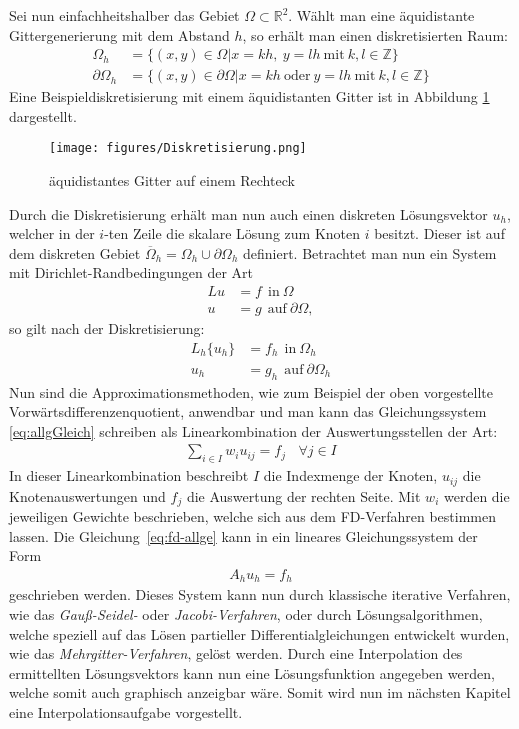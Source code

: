 \documentclass[12pt,titlepage]{article}
\begin{document}
Sei nun einfachheitshalber das Gebiet $\Omega\subset\mathbb{R}^2$. Wählt man eine äquidistante Gittergenerierung mit dem Abstand $h$, so erhält man einen diskretisierten Raum:
\begin{align}
 \Omega_h&=\{(x,y)\in\Omega|x=kh,~y=lh~\text{mit}~k,l\in\mathbb{Z}\}\nonumber\\
 \partial\Omega_h&=\{(x,y)\in\partial\Omega|x=kh~\text{oder}~y=lh~\text{mit}~k,l\in\mathbb{Z}\}\nonumber
\end{align}
Eine Beispieldiskretisierung mit einem äquidistanten Gitter ist in Abbildung \ref{fig:diskGit} dargestellt.
\begin{figure}[ht]
	\centering
	\texttt{[image: figures/Diskretisierung.png]}
	\caption[Diskretiesierung]{äquidistantes Gitter auf einem Rechteck}
	\label{fig:diskGit}
\end{figure}
Durch die Diskretisierung erhält man nun auch einen diskreten Lösungsvektor $u_h$, welcher in der $i$-ten Zeile die skalare Lösung zum Knoten $i$ besitzt. Dieser ist auf dem diskreten Gebiet $\overline{\Omega}_h=\Omega_h\cup\partial\Omega_h$ definiert. Betrachtet man nun ein System mit Dirichlet-Randbedingungen der Art
\begin{align}
 Lu&=f~~\text{in}~\Omega\nonumber\\
 u&=g~~\text{auf}~\partial\Omega\nonumber,
\end{align}
so gilt nach der Diskretisierung:
\begin{align}
 L_h\{u_h\}&=f_h~~\text{in}~\Omega_h\nonumber\\
 u_h&=g_h~~\text{auf}~\partial\Omega_h\label{eq:allgGleich}
\end{align}
Nun sind die Approximationsmethoden, wie zum Beispiel der oben vorgestellte Vorwärtsdifferenzenquotient, anwendbar und man kann das Gleichungssystem \eqref{eq:allgGleich} schreiben als Linearkombination der Auswertungsstellen der Art:
\begin{align}
 \sum_{i\in I}w_iu_{ij}=f_j~~~~\forall j\in I\label{eq:fd-allge}
\end{align}
In dieser Linearkombination beschreibt $I$ die Indexmenge der Knoten, $u_{ij}$ die Knotenauswertungen und $f_j$ die Auswertung der rechten Seite. Mit $w_i$ werden die jeweiligen Gewichte beschrieben, welche sich aus dem FD-Verfahren bestimmen lassen. Die Gleichung~\eqref{eq:fd-allge} kann in ein lineares Gleichungssystem der Form
\begin{align}
 A_hu_h=f_h\nonumber
\end{align}
geschrieben werden. Dieses System kann nun durch klassische iterative Verfahren, wie das \textit{Gauß-Seidel-} oder \textit{Jacobi-Verfahren}, oder durch Lösungsalgorithmen, welche speziell auf das Lösen partieller Differentialgleichungen entwickelt wurden, wie das \textit{Mehrgitter-Verfahren}, gelöst werden. Durch eine Interpolation des ermittellten Lösungsvektors kann nun eine Lösungsfunktion angegeben werden, welche somit auch graphisch anzeigbar wäre. Somit wird nun im nächsten Kapitel eine Interpolationsaufgabe vorgestellt.
\end{document}
